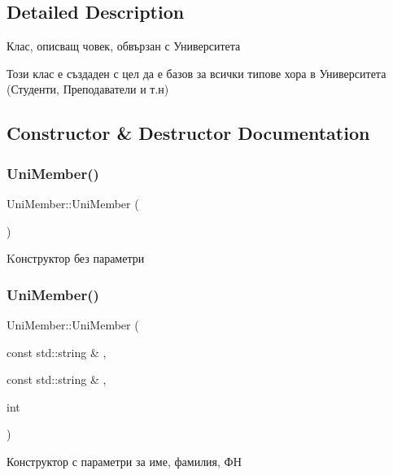 \subsection{Detailed Description}
Клас, описващ човек, обвързан с Университета 

Този клас е създаден с цел да е базов за всички типове хора в Университета (Студенти, Преподаватели и т.\+н) 

\subsection{Constructor \& Destructor Documentation}
\mbox{\label{class_uni_member_a421f3bbcb1c24efda7d9db2817115c11}} 
\subsubsection{\texorpdfstring{Uni\+Member()}{UniMember()}\hspace{0.1cm}{\footnotesize\ttfamily [1/3]}}
{\footnotesize\ttfamily Uni\+Member\+::\+Uni\+Member (\begin{DoxyParamCaption}{ }\end{DoxyParamCaption})}



Kонструктор без параметри 

\mbox{\label{class_uni_member_acb2e9cc54f0e8460d9db7f764966bbf3}} 
\subsubsection{\texorpdfstring{Uni\+Member()}{UniMember()}\hspace{0.1cm}{\footnotesize\ttfamily [2/3]}}
{\footnotesize\ttfamily Uni\+Member\+::\+Uni\+Member (\begin{DoxyParamCaption}\item[{const std\+::string \&}]{,  }\item[{const std\+::string \&}]{,  }\item[{int}]{ }\end{DoxyParamCaption})}



Конструктор с параметри за име, фамилия, ФН 

